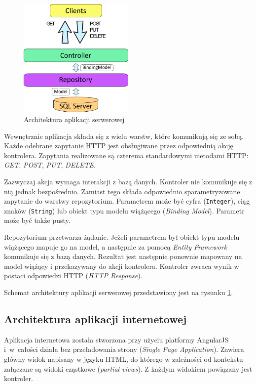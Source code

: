 \documentclass[a4paper]{book}
\begin{document}
			\begin{figure}
							\centering
							\includegraphics[width=0.5\textwidth]{images/architektura_server.pdf}
							\caption{Architektura aplikacji serwerowej}
							\label{fig:architektura_server}
		    \end{figure}
						
			Wewnętrznie aplikacja składa się z wielu warstw, które komunikują się ze sobą. Każde odebrane zapytanie HTTP jest obsługiwane przez odpowiednią akcję kontrolera. Zapytania realizowane są czterema standardowymi metodami HTTP: \emph{GET}, \emph{POST}, \emph{PUT}, \emph{DELETE}.
			
			Zazwyczaj akcja wymaga interakcji z bazą danych. Kontroler nie komunikuje się z nią jednak bezpośrednio. Zamiast tego składa odpowiednio sparametryzowane zapytanie do warstwy repozytorium. Parametrem może być cyfra (\texttt{Integer}), ciąg znaków (\texttt{String}) lub obiekt typu modelu wiążącego (\emph{Binding Model}). Parametr może być także pusty. 
			
			Repozytorium przetwarza żądanie. Jeżeli parametrem był obiekt typu modelu wiążącego mapuje go na model, a następnie za pomocą \emph{Entity Framework} komunikuje się z bazą danych. Rezultat jest następnie ponownie mapowany na model wiążący i przekazywany do akcji kontrolera. Kontroler zwraca wynik w postaci odpowiedzi HTTP (\emph{HTTP Response}).
			
			Schemat architektury aplikacji serwerowej przedstawiony jest na rysunku \ref{fig:architektura_server}. 			
			
			\subsection{Architektura aplikacji internetowej}		
			
			Aplikacja internetowa została stworzona przy użyciu platformy AngularJS i~w~całości działa bez przeładowania strony (\emph{Single Page Application}). Zawiera główny widok napisany w języku HTML, do którego w zależności od kontekstu załączane są widoki cząstkowe (\emph{partial views}). Z każdym widokiem powiązany jest kontroler. 
			
\end{document}
